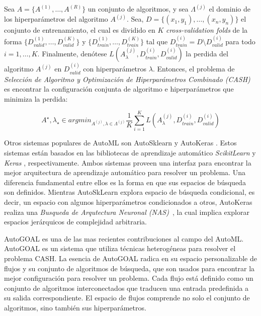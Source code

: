 \begin{definition}
\label{definition:cash}
    Sea $A = \{A^{(1)}, \dots, A^{(R)}\}$ un conjunto de algoritmos, y sea $\Lambda^{(j)}$ el dominio de los hiperparámetros del algoritmo $A^{(j)}$.
    Sea, $D = \{(x_1, y_1), \dots, (x_n, y_n)\}$ el conjunto de entrenamiento, el cual es dividido en $K$ \emph{cross-validation folds} de la forma $\{D_{valid}^{(1)}, \dots, D_{valid}^{(K)}\}$ y $\{D_{train}^{(1)}, \dots, D_{train}^{(K)}\}$ tal que $D_{train}^{(i)} = D \setminus D_{valid}^{(i)}$ para todo $i = 1, \dots, K$. Finalmente, denótese $L(A_{\lambda}^{(j)}, D_{train}^{(i)},D_{valid}^{(i)})$ la perdida del algoritmo $A^{(j)}$ en $D_{valid}^{(i)}$ con hiperparámetros $\lambda$.
    Entonces, el problema de \textit{Selección de Algoritmo y Optimización de Hiperparámetros Combinado (CASH)} es encontrar la configuración conjunta de algoritmo e hiperparámetros que minimiza la perdida:

    \begin{equation}
        A^{\star}, \lambda_{\star} \in argmin_{A^{(j)}, \lambda \in \Lambda^(j)} \frac{1}{K} \sum_{i=1}^K L(A_{\lambda}^{(j)}, D_{train}^{(i)},D_{valid}^{(i)})
    \end{equation}
\end{definition}

Otros sistemas populares de AutoML son AutoSklearn \parencite{feurer2015efficient} y AutoKeras \parencite{autoKeras}.
Estos sistemas están basados en las bibliotecas de aprendizaje automático \textit{ScikitLearn} \parencite{pedregosa2011scikit} y \textit{Keras} \parencite{chollet2015keras}, respectivamente.
Ambos sistemas proveen una interfaz para encontrar la mejor arquitectura de aprendizaje automático para resolver un problema.
Una diferencia fundamental entre ellos es la forma en que sus espacios de búsqueda son definidos.
Mientras AutoSkLearn explora espacio de búsqueda condicional, es decir, un espacio con algunos hiperparámetros condicionados a otros, AutoKeras realiza una \emph{Busqueda de Arqutectura Neuronal (NAS)}~\parencite{NAS}, la cual implica explorar espacios jerárquicos de complejidad arbitraria.

AutoGOAL \parencite{autogoal, estevez2020general} es una de las mas recientes contribuciones al campo del AutoML. AutoGOAL es un sistema que utiliza técnicas heterogéneas para resolver el problema CASH.
La esencia de AutoGOAL radica en su espacio personalizable de flujos y su conjunto de algoritmos de búsqueda, que son usados para encontrar la mejor configuración para resolver un problema.
Cada flujo está definido como un conjunto de algoritmos interconectados que traducen una entrada predefinida a su salida correspondiente.
El espacio de flujos comprende no solo el conjunto de algoritmos, sino también sus hiperparámetros.

